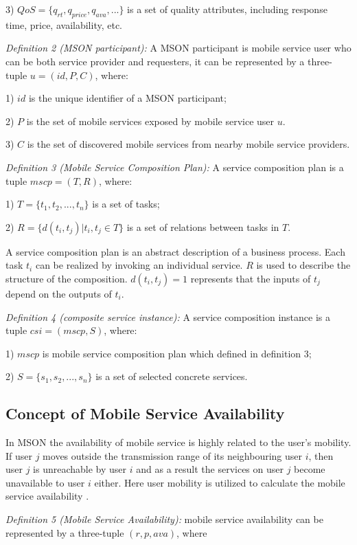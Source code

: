 \documentclass[10pt,journal,compsoc]{IEEEtran}
\begin{document}
​3) $QoS = \{ q_{rt}, q_{price}, q_{ava}, ... \}$ is a set of quality attributes, including response time, price, availability, etc.

\textit{Definition 2 (MSON participant):} A MSON participant is mobile service user who can be both service provider and requesters, it can be represented by a three-tuple $u = (id, P, C)$, where:

​1) $id$ is the unique identifier of a MSON participant;

​2) $P$ is the set of mobile services exposed by mobile service user $u$.

​3) $C$ is the set of discovered mobile services from nearby mobile service providers.

\textit{Definition 3 (Mobile Service Composition Plan):} A service composition plan is a tuple $mscp = (T, R)$, where:

​1) $T = \{t_1,t_2,...,t_n\}$ is a set of tasks;

​2) $R = \{d(t_i,t_j)|t_i,t_j \in T\}$ is a set of relations between tasks in $T$.

​A service composition plan is an abstract description of a business process. Each task $t_i$ can be realized by invoking an individual service. $R$ is used to describe the structure of the composition. $d(t_i, t_j) = 1$ represents that the inputs of $t_j$ depend on the outputs of $t_i$.

\textit{Definition 4 (composite service instance):} A service composition instance is a tuple $csi = (mscp, S)$, where:

​1) $mscp$ is mobile service composition plan which defined in definition 3;

​2) $S = \{s_1, s_2,...,s_n\}$ is a set of selected concrete services.

\subsection{Concept of Mobile Service Availability}
In MSON the availability of mobile service is highly related to the user’s mobility. If user $j$ moves outside the transmission range of its neighbouring user $i$, then user $j$ is unreachable by user $i$ and as a result the services on user $j$ become unavailable to user $i$ either. Here user mobility is utilized to calculate the mobile service availability \cite{Yang2010}.

\textit{Definition 5 (Mobile Service Availability):} mobile service availability can be represented by a three-tuple $(r, p, ava) $, where
\end{document}
